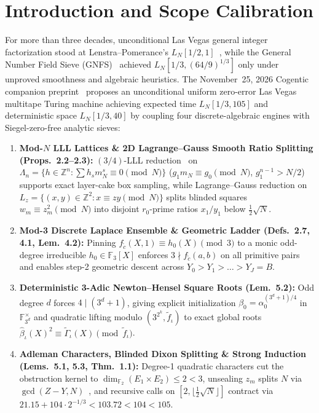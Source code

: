 \documentclass[10pt,twocolumn]{article}
\newcommand{\ZZ}{\mathbb{Z}}
\newcommand{\FF}{\mathbb{F}}
\begin{document}
\section{Introduction and Scope Calibration}\label{sec:intro}
For more than three decades, unconditional Las Vegas general integer factorization stood at Lenstra--Pomerance's $L_N[1/2, 1]$~\cite{lenstra1992rigorous}, while the General Number Field Sieve (GNFS)~\cite{buhler1993factoring} achieved $L_N[1/3, (64/9)^{1/3}]$ only under unproved smoothness and algebraic heuristics. The November~25, 2026 Cogentic companion preprint~\cite{cogentic2026l13factoring,cai2026cogentic} proposes an unconditional uniform zero-error Las Vegas multitape Turing machine achieving expected time $L_N[1/3, 105]$ and deterministic space $L_N[1/3, 40]$ by coupling four discrete-algebraic engines with Siegel-zero-free analytic sieves:
\begin{enumerate}[leftmargin=1.2em,itemsep=1pt,topsep=2pt]
  \item \textbf{Mod-$N$ LLL Lattices \& 2D Lagrange--Gauss Smooth Ratio Splitting (Props.~2.2--2.3):} $(3/4)$-LLL reduction~\cite{lenstra1982factoring} on $\Lambda_n = \{h\in\ZZ^n : \sum h_s m_N^s \equiv 0\pmod N\}$ ($g_1 m_N\equiv g_0\pmod N$, $g_1^{n-1}>N/2$) supports exact layer-cake box sampling, while Lagrange--Gauss reduction on $L_z = \{(x,y)\in\ZZ^2 : x\equiv z y\pmod N\}$ splits blinded squares $w_m \equiv z_m^2\pmod N$ into disjoint $r_0$-prime ratios $x_1/y_1$ below $\frac{1}{2}\sqrt{N}$.
  \item \textbf{Mod-3 Discrete Laplace Ensemble \& Geometric Ladder (Defs.~2.7, 4.1, Lem.~4.2):} Pinning $f_{\tilde{c}}(X,1)\equiv h_0(X)\pmod 3$ to a monic odd-degree irreducible $h_0\in\FF_3[X]$ enforces $3\nmid f_{\tilde{c}}(a,b)$ on all primitive pairs and enables step-2 geometric descent across $Y_0 > Y_1 > \dots > Y_J = B$.
  \item \textbf{Deterministic 3-Adic Newton--Hensel Square Roots (Lem.~5.2):} Odd degree $d$ forces $4\mid(3^d+1)$, giving explicit initialization $\beta_0 = \alpha_0^{(3^d+1)/4}$ in $\FF_{3^d}^\times$ and quadratic lifting modulo $(3^{2^k}, \tilde{f}_\iota)$ to exact global roots $\hat{\beta}_\iota(X)^2 \equiv \tilde{\Gamma}_\iota(X)\pmod{\tilde{f}_\iota}$.
  \item \textbf{Adleman Characters, Blinded Dixon Splitting \& Strong Induction (Lems.~5.1, 5.3, Thm.~1.1):} Degree-1 quadratic characters cut the obstruction kernel to $\dim_{\FF_2}(E_1\times E_2)\le 2 < 3$, unsealing $z_m$ splits $N$ via $\gcd(Z-Y,N)$~\cite{dixon1981asymptotically}, and recursive calls on $[2,\lfloor\frac{1}{2}\sqrt{N}\rfloor]$ contract via $21.15 + 104\cdot 2^{-1/3} < 103.72 < 104 < 105$.
\end{enumerate}
\end{document}
